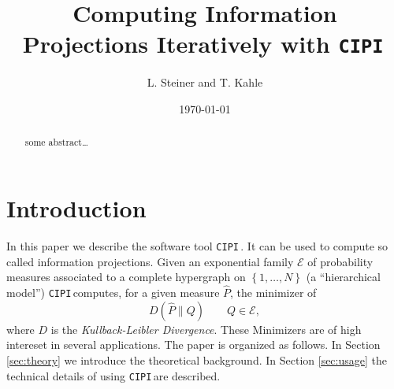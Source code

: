 \documentclass[12pt]{amsart}
\newcommand{\set}[1]{\left\lbrace #1 \right\rbrace} %
\newcommand{\cipi}{\texttt{CIPI}\,}
\theoremstyle{plain}%
\theoremstyle{definition}
\theoremstyle{remark}
\begin{document}
\title[CIPI]{Computing Information Projections Iteratively with \cipi}

\author{L. Steiner and T. Kahle}
\address{Max Planck Institute for Mathematics in the Sciences, Inselstrasse 22, D-04103 Leipzig, Germany}

\date{\today}
\begin{abstract}
  some abstract\ldots
\end{abstract}

\maketitle

\section{Introduction}
In this paper we describe the software tool \cipi. It can be used to compute so
called information projections. Given an exponential family $\mathcal{E}$ of probability
measures associated to a complete hypergraph on $\set{1,\ldots,N}$ (a ``hierarchical model'')
\cipi computes, for a given measure $\hat{P}$, the minimizer of 
\begin{equation*}
  D(\hat{P}\parallel Q) \qquad Q\in\mathcal{E}, 
\end{equation*} where $D$ is the \emph{Kullback-Leibler Divergence}. These
Minimizers are of high intereset in several applications.
The paper is organized as follows. In Section \ref{sec:theory} we introduce the
theoretical background. In Section \ref{sec:usage} the technical details of
using \cipi are described. 
\end{document}
